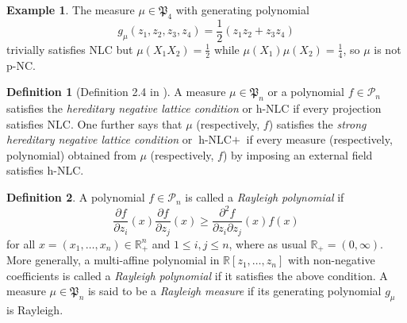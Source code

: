 \documentclass[10pt,reqno]{amsart}
\theoremstyle{plain}
\theoremstyle{definition}
\newtheorem{definition}{Definition}[section]
\newtheorem{example}{Example}[section]
\theoremstyle{remark}
\newcommand{\PP}{\mathcal{P}}
\newcommand{\NLC}{\text{NLC}}
\newcommand{\hNLC}{\text{h-NLC}}
\newcommand{\RR}{\mathbb{R}}
\newcommand{\fP}{\mathfrak{P}}
\begin{document}
\begin{example}\label{ex1}
The measure $\mu\in\fP_4$ with generating polynomial
$$g_\mu(z_1,z_2,z_3,z_4)=\frac{1}{2}(z_1z_2+z_3z_4)$$
trivially satisfies NLC but $\mu(X_1X_2)=\frac{1}{2}$ while 
$\mu(X_1)\mu(X_2)=\frac{1}{4}$, so $\mu$ is not p-NC. 
\end{example}

\begin{definition}[Definition 2.4 in \cite{P}]\label{h-nlc}
A measure $\mu\in\fP_n$ or a polynomial $f\in\PP_n$ 
satisfies the {\em hereditary negative lattice condition} or $\hNLC$ 
if every projection satisfies $\NLC$. One further says that $\mu$ 
(respectively, 
$f$) satisfies the {\em strong  hereditary negative lattice 
condition} or $\hNLC+$ if every measure (respectively, polynomial) obtained 
from $\mu$ (respectively, $f$) by imposing an external field satisfies
h-NLC.
\end{definition}

\begin{definition}\label{d1}
A polynomial $f\in\PP_n$ is called a {\em Rayleigh polynomial} if
\begin{equation}\label{ral-ineq}
\frac {\partial f} {\partial z_i}(x) \frac {\partial f} {\partial z_j}(x)
\geq \frac {\partial^2 f} {\partial z_i \partial z_j}(x) f(x)
\end{equation}
for all $x=(x_1,\ldots,x_n)\in \RR_+^n$ and $1\leq i,j \leq n$, where as 
usual $\RR_+=(0,\infty)$. More 
generally, a multi-affine 
polynomial in $\RR[z_1, \ldots, z_n]$ with non-negative coefficients is 
called a {\em Rayleigh polynomial} if it satisfies the above condition. 
A measure $\mu\in\fP_n$ is said to be a {\em Rayleigh measure} if its
generating polynomial $g_\mu$ is Rayleigh.
\end{definition}
\end{document}
